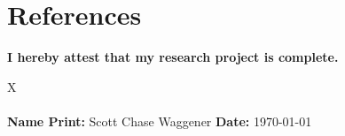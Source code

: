\documentclass[12pt]{article}
\begin{document}
\pagebreak
\section{References}
\noindent
\renewcommand{\refname}{}



\vspace{4\baselineskip}
\noindent
\textbf{I hereby attest that my research project is complete.}

\vspace{1cm}
\noindent X \underline{\hspace{10cm}}  \\
\\
\noindent \textbf{Name Print:} Scott Chase Waggener \hfill \textbf{Date:} \today
\end{document}

